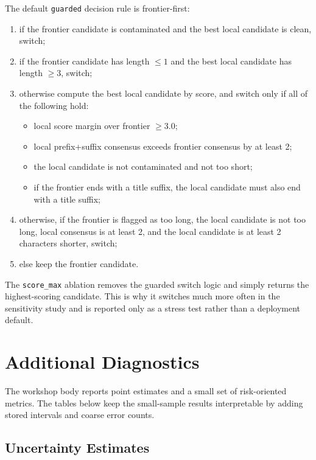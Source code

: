 \documentclass{article}
\begin{document}
The default \texttt{guarded} decision rule is frontier-first:
\begin{enumerate}
    \item if the frontier candidate is contaminated and the best local candidate is clean, switch;
    \item if the frontier candidate has length $\le 1$ and the best local candidate has length $\ge 3$, switch;
    \item otherwise compute the best local candidate by score, and switch only if all of the following hold:
    \begin{itemize}
        \item local score margin over frontier $\ge 3.0$;
        \item local prefix+suffix consensus exceeds frontier consensus by at least 2;
        \item the local candidate is not contaminated and not too short;
        \item if the frontier ends with a title suffix, the local candidate must also end with a title suffix;
    \end{itemize}
    \item otherwise, if the frontier is flagged as too long, the local candidate is not too long, local consensus is at least 2, and the local candidate is at least 2 characters shorter, switch;
    \item else keep the frontier candidate.
\end{enumerate}

The \texttt{score\_max} ablation removes the guarded switch logic and simply returns the highest-scoring candidate. This is why it switches much more often in the sensitivity study and is reported only as a stress test rather than a deployment default.

\section{Additional Diagnostics}

The workshop body reports point estimates and a small set of risk-oriented metrics. The tables below keep the small-sample results interpretable by adding stored intervals and coarse error counts.

\subsection{Uncertainty Estimates}
\end{document}
